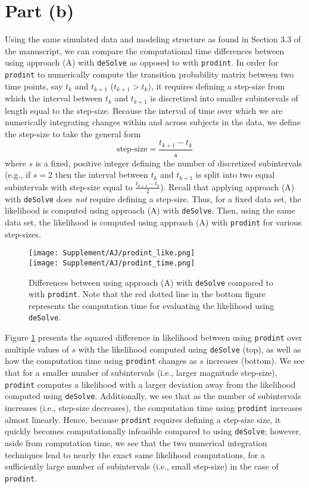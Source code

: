 \documentclass{article}
\begin{document}
\section*{Part (b)}
Using the same simulated data and modeling structure as found in Section 3.3 of the manuscript, we can compare the computational time differences between using approach (A) with \texttt{deSolve} as opposed to with \texttt{prodint}. In order for \texttt{prodint} to numerically compute the transition probability matrix between two time points, say $t_k$ and $t_{k+1}$ ($t_{k+1} > t_{k}$), it requires defining a step-size from which the interval between $t_k$ and $t_{k+1}$ is discretized into smaller subintervals of length equal to the step-size. Because the interval of time over which we are numerically integrating changes within and across subjects in the data, we define the step-size to take the general form 
$$\text{step-size} = \frac{t_{k+1} - t_{k}}{s}$$
where $s$ is a fixed, positive integer defining the number of discretized subintervals (e.g., if $s=2$ then the interval between $t_k$ and $t_{k+1}$ is split into two equal subintervals with step-size equal to $\frac{t_{k+1} - t_{k}}{2}$). Recall that applying approach (A) with \texttt{deSolve} does \textit{not} require defining a step-size. Thus, for a fixed data set, the likelihood is computed using approach (A) with \texttt{deSolve}. Then, using the same data set, the likelihood is computed using approach (A) with \texttt{prodint} for various step-sizes. \begin{figure}[!htb]
\centering
\texttt{[image: Supplement/AJ/prodint\_like.png]}\\
\texttt{[image: Supplement/AJ/prodint\_time.png]}
\caption{\footnotesize Differences between using approach (A) with \texttt{deSolve} compared to with \texttt{prodint}. Note that the red dotted line in the bottom figure represents the computation time for evaluating the likelihood using \texttt{deSolve}. }\label{fig:b1}
\end{figure}
Figure \ref{fig:b1} presents the squared difference in likelihood between using \texttt{prodint} over multiple values of $s$ with the likelihood computed using \texttt{deSolve} (top), as well as how the computation time using \texttt{prodint} changes as $s$ increases (bottom). We see that for a smaller number of subintervals (i.e., larger magnitude step-size), \texttt{prodint} computes a likelihood with a larger deviation away from the likelihood computed using \texttt{deSolve}. Additionally, we see that as the number of subintervals increases (i.e., step-size decreases), the computation time using \texttt{prodint} increases almost linearly. Hence, because \texttt{prodint} requires defining a step-size size, it quickly becomes computationally infeasible compared to using \texttt{deSolve}; however, aside from computation time, we see that the two numerical integration techniques lead to nearly the exact same likelihood computations, for a sufficiently large number of subintervals (i.e., small step-size) in the case of \texttt{prodint}.
\end{document}

